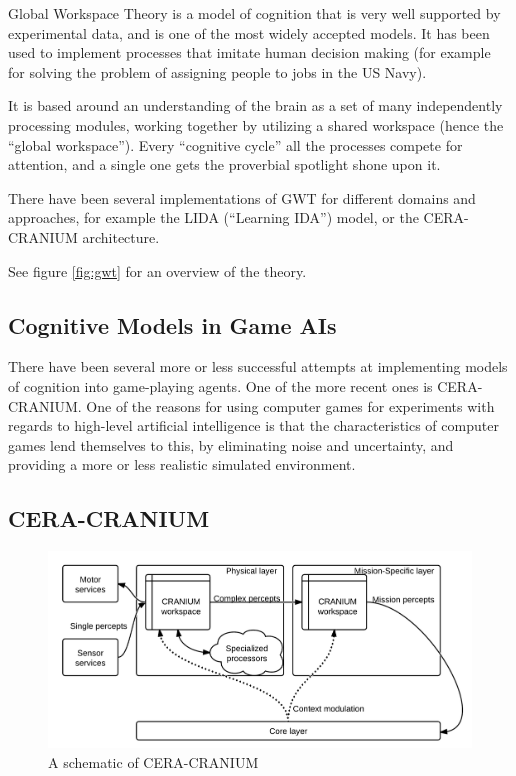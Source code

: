 Global Workspace Theory is a model of cognition that is very well supported by
experimental data, and is one of the most widely accepted
models.\cite{dehaene2001towards} It has been used to implement processes that
imitate human decision making (for example for solving the problem of assigning
people to jobs in the US Navy).\cite{baars2005gwt}\cite{franklin2003interacting}

It is based around an understanding of the brain as a set of many independently
processing modules, working together by utilizing a shared workspace (hence the
``global workspace''). Every ``cognitive cycle'' all the
processes compete for attention, and a single one gets the
proverbial spotlight shone upon it.\cite{baars2005gwt}

There have been several implementations of GWT for different domains and
approaches, for example the LIDA (``Learning IDA'')
model\cite{franklin2007lida}, or the CERA-CRANIUM
architecture\cite{arrabales2009ceracranium}.

See figure \ref{fig:gwt} for an overview of the theory.

\subsection{Cognitive Models in Game AIs}
There have been several more or less successful attempts at implementing models
of cognition into game-playing agents. One of the more recent ones is
CERA-CRANIUM. One of the reasons for using computer games for experiments with regards to
high-level artificial intelligence is that the characteristics of computer
games lend themselves to this, by eliminating noise and uncertainty, and
providing a more or less realistic simulated environment.


\subsection{CERA-CRANIUM}
\begin{figure}[h!tb]
\centering
\includegraphics[scale=1.0]{graphics/ceracranium.png}
\caption{A schematic of CERA-CRANIUM\cite{arrabales2009ceracranium}}
\label{fig:ceracranium}
\end{figure}

